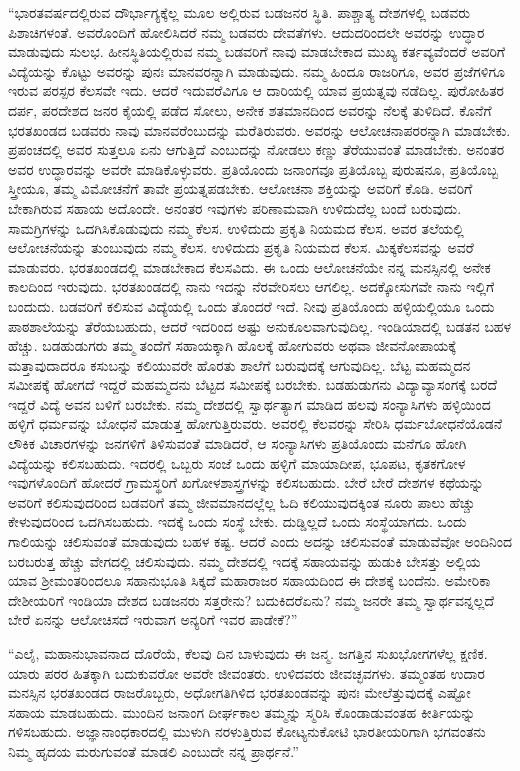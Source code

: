  “ಭಾರತವರ್ಷದಲ್ಲಿರುವ ದೌರ್ಭಾಗ್ಯಕ್ಕೆಲ್ಲ ಮೂಲ ಅಲ್ಲಿರುವ ಬಡಜನರ ಸ್ಥಿತಿ. ಪಾಶ್ಚಾತ್ಯ ದೇಶಗಳಲ್ಲಿ ಬಡವರು ಪಿಶಾಚಿಗಳಂತೆ. ಅವರೊಂದಿಗೆ ಹೋಲಿಸಿದರೆ ನಮ್ಮ ಬಡವರು ದೇವತೆಗಳು. ಆದುದರಿಂದಲೇ ಅವರನ್ನು ಉದ್ಧಾರ ಮಾಡುವುದು ಸುಲಭ. ಹೀನಸ್ಥಿತಿಯಲ್ಲಿರುವ ನಮ್ಮ ಬಡವರಿಗೆ ನಾವು ಮಾಡಬೇಕಾದ ಮುಖ್ಯ ಕರ್ತವ್ಯವೆಂದರೆ ಅವರಿಗೆ ವಿದ್ಯೆಯನ್ನು ಕೊಟ್ಟು ಅವರನ್ನು ಪುನಃ ಮಾನವರನ್ನಾಗಿ ಮಾಡುವುದು. ನಮ್ಮ ಹಿಂದೂ ರಾಜರಿಗೂ, ಅವರ ಪ್ರಜೆಗಳಿಗೂ ಇರುವ ಪರಸ್ಪರ ಕೆಲಸವೇ ಇದು. ಆದರೆ ಇದುವರೆವಿಗೂ ಆ ದಾರಿಯಲ್ಲಿ ಯಾವ ಪ್ರಯತ್ನವು ನಡೆದಿಲ್ಲ. ಪುರೋಹಿತರ ದರ್ಪ, ಪರದೇಶದ ಜನರ ಕೈಯಲ್ಲಿ ಪಡೆದ ಸೋಲು, ಅನೇಕ ಶತಮಾನದಿಂದ ಅವರನ್ನು ನೆಲಕ್ಕೆ ತುಳಿದಿದೆ. ಕೊನೆಗೆ ಭರತಖಂಡದ ಬಡವರು ನಾವು ಮಾನವರೆಂಬುದನ್ನು ಮರೆತಿರುವರು. ಅವರನ್ನು ಆಲೋಚನಾಪರರನ್ನಾಗಿ ಮಾಡಬೇಕು. ಪ್ರಪಂಚದಲ್ಲಿ ಅವರ ಸುತ್ತಲೂ ಏನು ಆಗುತ್ತಿದೆ ಎಂಬುದನ್ನು ನೋಡಲು ಕಣ್ಣು ತೆರೆಯುವಂತೆ ಮಾಡಬೇಕು. ಅನಂತರ ಅವರ ಉದ್ಧಾರವನ್ನು ಅವರೇ ಮಾಡಿಕೊಳ್ಳುವರು. ಪ್ರತಿಯೊಂದು ಜನಾಂಗವೂ ಪ್ರತಿಯೊಬ್ಬ ಪುರುಷನೂ, ಪ್ರತಿಯೊಬ್ಬ ಸ್ತ್ರೀಯೂ, ತಮ್ಮ ವಿಮೋಚನೆಗೆ ತಾವೇ ಪ್ರಯತ್ನಪಡಬೇಕು. ಆಲೋಚನಾ ಶಕ್ತಿಯನ್ನು ಅವರಿಗೆ ಕೊಡಿ. ಅವರಿಗೆ ಬೇಕಾಗಿರುವ ಸಹಾಯ ಅದೊಂದೇ. ಅನಂತರ ಇವುಗಳು ಪರಿಣಾಮವಾಗಿ ಉಳಿದುದೆಲ್ಲ ಬಂದೆ ಬರುವುದು. ಸಾಮಗ್ರಿಗಳನ್ನು ಒದಗಿಸಿಕೊಡುವುದು ನಮ್ಮ ಕೆಲಸ. ಉಳಿದುದು ಪ್ರಕೃತಿ ನಿಯಮದ ಕೆಲಸ. ಅವರ ತಲೆಯಲ್ಲಿ ಆಲೋಚನೆಯನ್ನು ತುಂಬುವುದು ನಮ್ಮ ಕೆಲಸ. ಉಳಿದುದು ಪ್ರಕೃತಿ ನಿಯಮದ ಕೆಲಸ. ಮಿಕ್ಕಕೆಲಸವನ್ನು ಅವರೆ ಮಾಡುವರು. ಭರತಖಂಡದಲ್ಲಿ ಮಾಡಬೇಕಾದ ಕೆಲಸವಿದು. ಈ ಒಂದು ಆಲೋಚನೆಯೇ ನನ್ನ ಮನಸ್ಸಿನಲ್ಲಿ ಅನೇಕ ಕಾಲದಿಂದ ಇರುವುದು. ಭರತಖಂಡದಲ್ಲಿ ನಾನು ಇದನ್ನು ನೆರವೇರಿಸಲು ಆಗಲಿಲ್ಲ. ಅದಕ್ಕೋಸುಗವೇ ನಾನು ಇಲ್ಲಿಗೆ ಬಂದುದು. ಬಡವರಿಗೆ ಕಲಿಸುವ ವಿದ್ಯೆಯಲ್ಲಿ ಒಂದು ತೊಂದರೆ ಇದೆ. ನೀವು ಪ್ರತಿಯೊಂದು ಹಳ್ಳಿಯಲ್ಲಿಯೂ ಒಂದು ಪಾಠಶಾಲೆಯನ್ನು ತೆರೆಯಬಹುದು, ಆದರೆ ಇದರಿಂದ ಅಷ್ಟು ಅನುಕೂಲವಾಗುವುದಿಲ್ಲ. ಇಂಡಿಯಾದಲ್ಲಿ ಬಡತನ ಬಹಳ ಹೆಚ್ಚು. ಬಡಹುಡುಗರು ತಮ್ಮ ತಂದೆಗೆ ಸಹಾಯಕ್ಕಾಗಿ ಹೊಲಕ್ಕೆ ಹೋಗುವರು ಅಥವಾ ಜೀವನೋಪಾಯಕ್ಕೆ ಮತ್ತಾವುದಾದರೂ ಕಸುಬನ್ನು ಕಲಿಯುವರೇ ಹೊರತು ಶಾಲೆಗೆ ಬರುವುದಕ್ಕೆ ಆಗುವುದಿಲ್ಲ. ಬೆಟ್ಟ ಮಹಮ್ಮದನ ಸಮೀಪಕ್ಕೆ ಹೋಗದೆ ಇದ್ದರೆ ಮಹಮ್ಮದನು ಬೆಟ್ಟದ ಸಮೀಪಕ್ಕೆ ಬರಬೇಕು. ಬಡಹುಡುಗನು ವಿದ್ಯಾವ್ಯಾಸಂಗಕ್ಕೆ ಬರದೆ ಇದ್ದರೆ ವಿದ್ಯೆ ಅವನ ಬಳಿಗೆ ಬರಬೇಕು. ನಮ್ಮ ದೇಶದಲ್ಲಿ ಸ್ವಾರ್ಥತ್ಯಾಗ ಮಾಡಿದ ಹಲವು ಸಂನ್ಯಾಸಿಗಳು ಹಳ್ಳಿಯಿಂದ ಹಳ್ಳಿಗೆ ಧರ್ಮವನ್ನು ಬೋಧನೆ ಮಾಡುತ್ತ ಹೋಗುತ್ತಿರುವರು. ಅವರಲ್ಲಿ ಕೆಲವರನ್ನು ಸೇರಿಸಿ ಧರ್ಮಬೋಧನೆಯೊಡನೆ ಲೌಕಿಕ ವಿಚಾರಗಳನ್ನು ಜನಗಳಿಗೆ ತಿಳಿಸುವಂತೆ ಮಾಡಿದರೆ, ಆ ಸಂನ್ಯಾಸಿಗಳು ಪ್ರತಿಯೊಂದು ಮನೆಗೂ ಹೋಗಿ ವಿದ್ಯೆಯನ್ನು ಕಲಿಸಬಹುದು. ಇದರಲ್ಲಿ ಒಬ್ಬರು ಸಂಜೆ ಒಂದು ಹಳ್ಳಿಗೆ ಮಾಯಾದೀಪ, ಭೂಪಟ, ಕೃತಕಗೋಳ ಇವುಗಳೊಂದಿಗೆ ಹೋದರೆ ಗ್ರಾಮಸ್ಥರಿಗೆ ಖಗೋಳಶಾಸ್ತ್ರಗಳನ್ನು ಕಲಿಸಬಹುದು. ಬೇರೆ ಬೇರೆ ದೇಶಗಳ ಕಥೆಯನ್ನು ಅವರಿಗೆ ಕಲಿಸುವುದರಿಂದ ಬಡವರಿಗೆ ತಮ್ಮ ಜೀವಮಾನದಲ್ಲೆಲ್ಲ ಓದಿ ಕಲಿಯುವುದಕ್ಕಿಂತ ನೂರು ಪಾಲು ಹೆಚ್ಚು ಕೇಳುವುದರಿಂದ ಒದಗಿಸಬಹುದು. ಇದಕ್ಕೆ ಒಂದು ಸಂಸ್ಥೆ ಬೇಕು. ದುಡ್ಡಿಲ್ಲದೆ ಒಂದು ಸಂಸ್ಥೆಯಾಗದು. ಒಂದು ಗಾಲಿಯನ್ನು ಚಲಿಸುವಂತೆ ಮಾಡುವುದು ಬಹಳ ಕಷ್ಟ. ಆದರೆ ಎಂದು ಅದನ್ನು ಚಲಿಸುವಂತೆ ಮಾಡುವೆವೋ ಅಂದಿನಿಂದ ಬರಬರುತ್ತ ಹೆಚ್ಚು ವೇಗದಲ್ಲಿ ಚಲಿಸುವುದು. ನಮ್ಮ ದೇಶದಲ್ಲಿ ಇದಕ್ಕೆ ಸಹಾಯವನ್ನು ಹುಡುಕಿ ಬೇಸತ್ತು ಅಲ್ಲಿಯ ಯಾವ ಶ‍್ರೀಮಂತರಿಂದಲೂ ಸಹಾನುಭೂತಿ ಸಿಕ್ಕದೆ ಮಹಾರಾಜರ ಸಹಾಯದಿಂದ ಈ ದೇಶಕ್ಕೆ ಬಂದೆನು. ಅಮೇರಿಕಾ ದೇಶೀಯರಿಗೆ ಇಂಡಿಯಾ ದೇಶದ ಬಡಜನರು ಸತ್ತರೇನು? ಬದುಕಿದರೆಏನು? ನಮ್ಮ ಜನರೇ ತಮ್ಮ ಸ್ವಾರ್ಥವನ್ನಲ್ಲದೆ ಬೇರೆ ಏನನ್ನು ಆಲೋಚಿಸದೆ ಇರುವಾಗ ಅನ್ಯರಿಗೆ ಇವರ ಪಾಡೇಕೆ?” 

 “ಎಲೈ, ಮಹಾನುಭಾವನಾದ ದೊರೆಯೆ, ಕೆಲವು ದಿನ ಬಾಳುವುದು ಈ ಜನ್ಮ. ಜಗತ್ತಿನ ಸುಖಭೋಗಗಳೆಲ್ಲ ಕ್ಷಣಿಕ. ಯಾರು ಪರರ ಹಿತಕ್ಕಾಗಿ ಬದುಕುವರೋ ಅವರೇ ಜೀವಂತರು. ಉಳಿದವರು ಜೀವಚ್ಛವಗಳು. ತಮ್ಮಂತಹ ಉದಾರ ಮನಸ್ಸಿನ ಭರತಖಂಡದ ರಾಜರೊಬ್ಬರು, ಅಧೋಗತಿಗಿಳಿದ ಭರತಖಂಡವನ್ನು ಪುನಃ ಮೇಲೆತ್ತುವುದಕ್ಕೆ ಎಷ್ಟೋ ಸಹಾಯ ಮಾಡಬಹುದು. ಮುಂದಿನ ಜನಾಂಗ ದೀರ್ಘಕಾಲ ತಮ್ಮನ್ನು ಸ್ಮರಿಸಿ ಕೊಂಡಾಡುವಂತಹ ಕೀರ್ತಿಯನ್ನು ಗಳಿಸಬಹುದು. ಅಜ್ಞಾನಾಂಧಕಾರದಲ್ಲಿ ಮುಳುಗಿ ನರಳುತ್ತಿರುವ ಕೋಟ್ಯನುಕೋಟಿ ಭಾರತೀಯರಿಗಾಗಿ ಭಗವಂತನು ನಿಮ್ಮ ಹೃದಯ ಮರುಗುವಂತೆ ಮಾಡಲಿ ಎಂಬುದೇ ನನ್ನ ಪ್ರಾರ್ಥನೆ.” 

